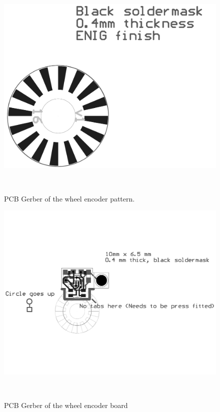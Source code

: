 \begin{figure}[t]
\centering
  \centerline{\includegraphics[origin=c, width=0.6\paperwidth]{pictures/appendix/PCB_Encoder_v2_single_16.pdf}}
  \caption{PCB Gerber of the wheel encoder pattern.}~\label{fig:wheel_pattern_encoder}
\end{figure}

\begin{figure}[t]
\centering
  \centerline{\includegraphics[angle=90,origin=c, width=0.8\paperwidth]{pictures/appendix/PCB_ir_encoder.pdf}}
  \caption{PCB Gerber of the wheel encoder board}~\label{fig:PCB_ir_encoder}
\end{figure}

